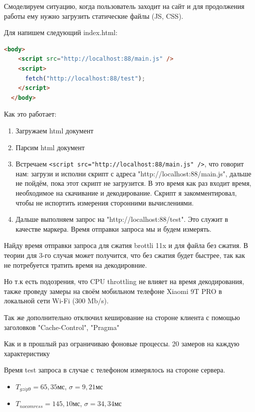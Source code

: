 \documentclass[12pt]{article}
\begin{document}
Смоделируем ситуацию, когда пользователь заходит на сайт и для продолжения работы ему нужно загрузить статические файлы (JS, CSS).

Для напишем следующий index.html:

\begin{lstlisting}[language=HTML]
  <body>
    <script src="http://localhost:88/main.js" />
    <script>
      fetch("http://localhost:88/test");
    </script>
  </body>
\end{lstlisting}

Как это работает:

\begin{enumerate}
    \item Загружаем html документ
    \item Парсим html документ
    \item Встречаем \verb|<script src="http://localhost:88/main.js" />|, что говорит нам: загрузи и исполни скрипт с адреса "http://localhost:88/main.js",
          дальше не пойдём, пока этот скрипт не загрузится. В это время как раз входит время, необходимое на скачивание и декодирование.
          Скрипт я закомментировал, чтобы не испортить измерения сторонними вычислениями.
    \item Дальше выполняем запрос на "http://localhost:88/test". Это служит в качестве маркера. Время отправки запроса мы и будем измерять.
\end{enumerate}

Найду время отправки запроса для сжатия brottli 11x и для файла без сжатия. В теории для 3-го случая может получится, что без сжатия будет быстрее,
так как не потребуется тратить время на декодировние.

Но т.к есть подозрения, что CPU throttling не влияет на время декодирования, также проведу замеры на своём мобильном телефоне Xiaomi 9T PRO в локальной сети Wi-Fi (300 Mb/s).

Так же дополнительно отключил кеширование на стороне клиента с помощью заголовков "Cache-Control", "Pragma"

Как и в прошлый раз ограничиваю фоновые процессы. 20 замеров на каждую характеристику

Время test запроса в случае с телефоном измерялось на стороне сервера.

\begin{itemize}
    \item $T_{gzip9}=65,35$мс, $\sigma = 9,21$мс
    \item $T_{no comress}=145,10$мс, $\sigma = 34,34$мс
\end{itemize}
\end{document}
